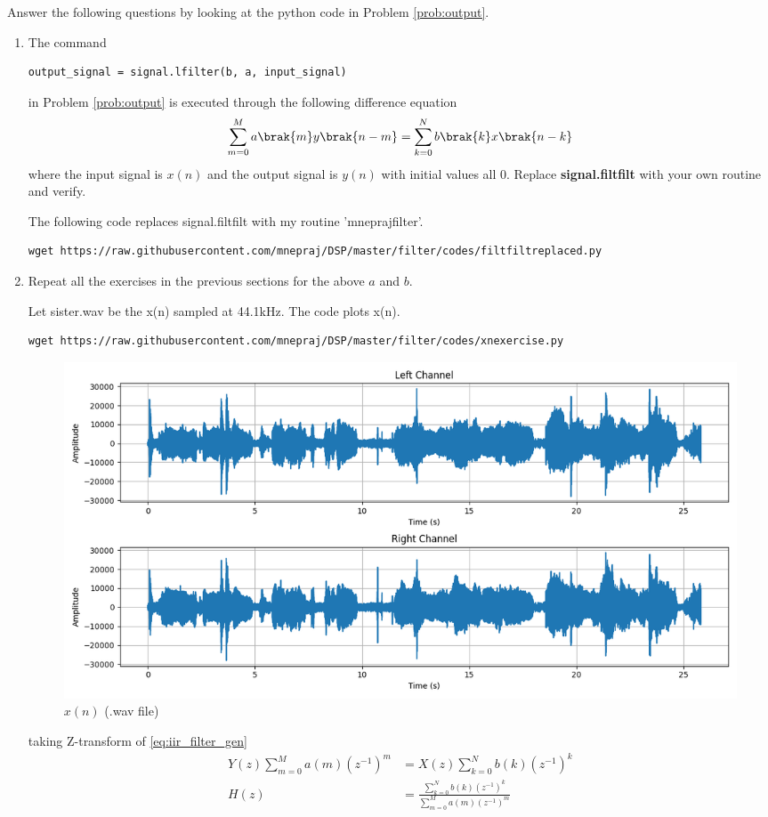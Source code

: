 \documentclass[journal,12pt,twocolumn]{IEEEtran}
\renewcommand\thesection{\arabic{section}}
\begin{document}
Answer the following questions by looking at the python code in Problem \ref{prob:output}.
\begin{enumerate}[label=\thesection.\arabic*]
	\item
	      The command
	      \begin{lstlisting}
output_signal = signal.lfilter(b, a, input_signal)
\end{lstlisting}
	      in Problem \ref{prob:output} is executed through the following difference equation
	      \begin{equation}
		      \label{eq:iir_filter_gen}
		      \sum _{m=0}^{M}a\brak{m}y\brak{n-m}=\sum _{k=0}^{N}b\brak{k}x\brak{n-k}
	      \end{equation}
	      where the input signal is $x(n)$ and the output signal is $y(n)$ with initial values all 0. Replace
	      \textbf{signal.filtfilt} with your own routine and verify.

	      \solution
	      The following code replaces signal.filtfilt with my routine 'mneprajfilter'.
	      \begin{lstlisting}
wget https://raw.githubusercontent.com/mnepraj/DSP/master/filter/codes/filtfiltreplaced.py
\end{lstlisting}



	\item Repeat all the exercises in the previous sections for the above $a$ and $b$.

	      \solution
	      Let sister.wav be the x(n) sampled at 44.1kHz.
	      The code plots x(n).
	      \begin{lstlisting}
wget https://raw.githubusercontent.com/mnepraj/DSP/master/filter/codes/xnexercise.py
\end{lstlisting}
	      \begin{figure}[h]
		      \centering
		      \includegraphics[width=\columnwidth]{figs/xnexercise.png}
		      \caption{$x(n)$ (.wav file)}
		      \label{fig:xn_exercise}
	      \end{figure}
	      taking Z-transform of \eqref{eq:iir_filter_gen}
	      \begin{align}
		      Y(z) \sum_{m=0}^{M} a(m)(z^{-1})^m & = X(z) \sum_{k=0}^{N} b(k)(z^{-1})^k                                  \\
		      H(z)                               & = \frac{\sum_{k=0}^{N} b(k)(z^{-1})^k}{\sum_{m=0}^{M} a(m)(z^{-1})^m}
	      \end{align}


\end{enumerate}
\end{document}
